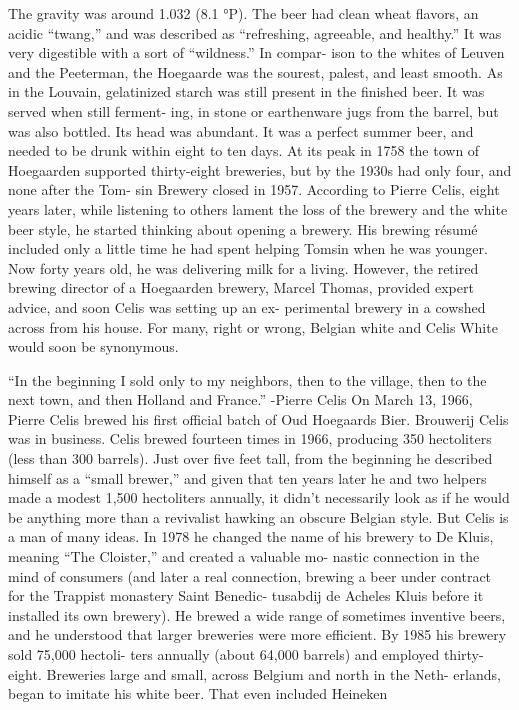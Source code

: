 \documentclass[a4paper,parskip=half]{scrartcl}
\begin{document}
\parencite[47]{Hieronymus2010}
The gravity was around 1.032 (8.1 °P). The beer had clean wheat
flavors, an acidic “twang,” and was described as “refreshing, agreeable,
and healthy.” It was very digestible with a sort of “wildness.” In compar-
ison to the whites of Leuven and the Peeterman, the Hoegaarde was the
sourest, palest, and least smooth. As in the Louvain, gelatinized starch
was still present in the finished beer. It was served when still ferment-
ing, in stone or earthenware jugs from the barrel, but was also bottled.
Its head was abundant. It was a perfect summer beer, and needed to be
drunk within eight to ten days.
At its peak in 1758 the town of Hoegaarden supported thirty-eight
breweries, but by the 1930s had only four, and none after the Tom-
sin Brewery closed in 1957. According to Pierre Celis, eight years later,
while listening to others lament the loss of the brewery and the white
beer style, he started thinking about opening a brewery. His brewing
résumé included only a little time he had spent helping Tomsin when he
was younger. Now forty years old, he was delivering milk for a living.
However, the retired brewing director of a Hoegaarden brewery, Marcel
Thomas, provided expert advice, and soon Celis was setting up an ex-
perimental brewery in a cowshed across from his house.
For many, right or wrong, Belgian white and Celis White would
soon be synonymous.

\parencite[48]{Hieronymus2010}

“In the beginning I sold only to my neighbors, then to the village, then
to the next town, and then Holland and France.”
-Pierre Celis
On March 13, 1966, Pierre Celis brewed his first official batch of Oud Hoegaards
Bier. Brouwerij Celis was in business. Celis brewed fourteen times in
1966, producing 350 hectoliters (less than 300 barrels). Just over five
feet tall, from the beginning he described himself as a “small brewer,”
and given that ten years later he and two helpers made a modest 1,500
hectoliters annually, it didn’t necessarily look as if he would be anything
more than a revivalist hawking an obscure Belgian style.
But Celis is a man of many ideas. In 1978 he changed the name of his
brewery to De Kluis, meaning “The Cloister,” and created a valuable mo-
nastic connection in the mind of consumers (and later a real connection,
brewing a beer under contract for the Trappist monastery Saint Benedic-
tusabdij de Acheles Kluis before it installed its own brewery). He brewed
a wide range of sometimes inventive beers, and he understood that larger
breweries were more efficient. By 1985 his brewery sold 75,000 hectoli-
ters annually (about 64,000 barrels) and employed thirty-eight.
Breweries large and small, across Belgium and north in the Neth-
erlands, began to imitate his white beer. That even included Heineken
\end{document}
